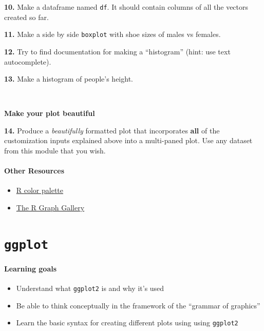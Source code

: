 \documentclass[]{book}
\providecommand{\tightlist}{%
  \setlength{\itemsep}{0pt}\setlength{\parskip}{0pt}}
\begin{document}
\textbf{10.} Make a dataframe named \texttt{df}. It should contain columns of all the vectors created so far.

\textbf{11.} Make a side by side \texttt{boxplot} with shoe sizes of males vs females.

\textbf{12.} Try to find documentation for making a ``histogram'' (hint: use text autocomplete).

\textbf{13.} Make a histogram of people's height.

~

\textbf{Make your plot beautiful}

\textbf{14.} Produce a \emph{beautifully} formatted plot that incorporates \textbf{all} of the customization inputs explained above into a multi-paned plot. Use any dataset from this module that you wish.

\hypertarget{other-resources-2}{%
\subsubsection*{Other Resources}\label{other-resources-2}}

\begin{itemize}
\tightlist
\item
  \href{http://www.stat.columbia.edu/~tzheng/files/Rcolor.pdf}{R color palette}\\
\item
  \href{https://www.r-graph-gallery.com/}{The R Graph Gallery}
\end{itemize}

\hypertarget{ggplot}{%
\chapter{\texorpdfstring{\texttt{ggplot}}{ggplot}}\label{ggplot}}

\hypertarget{learning-goals-9}{%
\subsubsection*{Learning goals}\label{learning-goals-9}}

\begin{itemize}
\tightlist
\item
  Understand what \texttt{ggplot2} is and why it's used
\item
  Be able to think conceptually in the framework of the ``grammar of graphics''
\item
  Learn the basic syntax for creating different plots using using \texttt{ggplot2}
\end{itemize}
\end{document}
